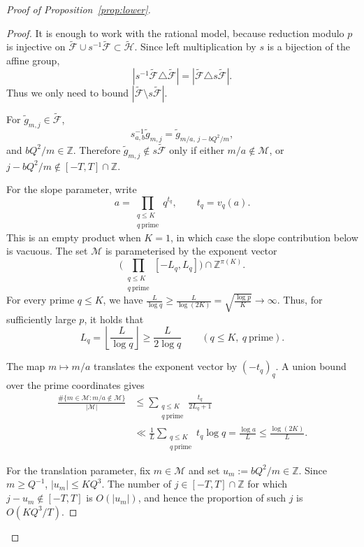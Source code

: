 \documentclass[11pt,letterpaper,reqno]{amsart}
\theoremstyle{definition}
\newcommand{\Z}{\mathbb Z}
\newcommand{\1}{\mathbf 1}
\begin{document}
\begin{proof}[Proof of Proposition~\ref{prop:lower}]
\begin{proof}
It is enough to work with the rational model, because reduction modulo $p$ is
injective on $\widetilde{\mathcal F}\cup s^{-1}\widetilde{\mathcal F}\subset
\widetilde{\mathcal H}$.  Since left multiplication by $s$ is a bijection of the
affine group,
\[
    |s^{-1}\widetilde{\mathcal F}\triangle\widetilde{\mathcal F}|
    =|\widetilde{\mathcal F}\triangle s\widetilde{\mathcal F}|.
\]
Thus we only need to bound $|\widetilde{\mathcal F}\setminus s\widetilde{\mathcal F}|$.

For $\widetilde g_{m,j}\in\widetilde{\mathcal F}$,
\[
    s_{a,b}^{-1}\widetilde g_{m,j}
    =\widetilde g_{m/a,\, j-bQ^2/m},
\]
and $bQ^2/m\in\Z$.  Therefore $\widetilde g_{m,j}\notin
s\widetilde{\mathcal F}$ only if either $m/a\notin\mathcal M$, or
$j-bQ^2/m\notin[-T,T]\cap\Z$.

For the slope parameter, write
\[
    a=\prod_{\substack{q\le K\\ q\ \mathrm{prime}}}q^{t_q},
    \qquad t_q=v_q(a).
\]
This is an empty product when \(K=1\), in which case the slope contribution
below is vacuous.  The set \(\mathcal M\) is parameterised by the exponent vector
\[
\Big(\prod_{\substack{q\le K\\ q\ \mathrm{prime}}}
    [-L_q,L_q]\Big)\cap\Z^{\pi(K)} .
\]
For every prime \(q\le K\), we have $ \frac{L}{\log q}\ge \frac{L}{\log(2K)}=\sqrt{\frac{\log p}{K}}\to\infty $. 
Thus, for sufficiently large \(p\), it holds that
\[ L_q=\left\lfloor\frac{L}{\log q}\right\rfloor
    \ge \frac{L}{2\log q}
    \qquad (q\le K,\ q\ \mathrm{prime}).
\]

The map \(m\mapsto m/a\) translates the exponent vector by \((-t_q)_q\).
A union bound over the prime coordinates gives
\[
\begin{aligned}
    \frac{\#\{m\in\mathcal M:m/a\notin\mathcal M\}}{|\mathcal M|}
    &\le \sum_{\substack{q\le K\\ q\ \mathrm{prime}}}
        \frac{t_q}{2L_q+1}  \\
    &\ll \frac1L
        \sum_{\substack{q\le K\\ q\ \mathrm{prime}}} t_q\log q
      = \frac{\log a}{L}
      \le \frac{\log(2K)}{L}.
\end{aligned}
\]

For the translation parameter, fix $m\in\mathcal M$ and set
$u_m:=bQ^2/m\in\Z$.  Since $m\ge Q^{-1}$, $|u_m|\le KQ^3$.  The number of
$j\in[-T,T]\cap\Z$ for which $j-u_m\notin[-T,T]$ is $O(|u_m|)$, and hence the
proportion of such $j$ is $O(KQ^3/T)$.


\end{proof}
\end{proof}
\end{document}
